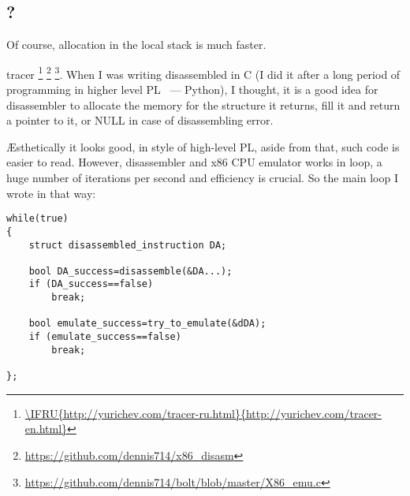 ﻿\subsection{?}

{Of course, allocation in the local stack is much faster}.

 tracer
\footnote{\url{\IFRU{http://yurichev.com/tracer-ru.html}{http://yurichev.com/tracer-en.html}}}
\footnote{\url{https://github.com/dennis714/x86_disasm}} 
\footnote{\url{https://github.com/dennis714/bolt/blob/master/X86_emu.c}}.
{When I was writing disassembled in C (I did it after a long period of programming in higher level 
\ac{PL} ~---
Python), I thought, it is a good idea for disassembler to allocate the memory for the structure it returns,
fill it and return a pointer to it, or NULL in case of disassembling error}.

{\AE{}sthetically it looks good, in style of high-level \ac{PL}, aside from that, such code is easier to read}.
{However, disassembler and x86 CPU emulator works in loop, a huge number of iterations per second and efficiency
is crucial}.
{So the main loop I wrote in that way}:

\begin{lstlisting}
while(true)
{
	struct disassembled_instruction DA;

	bool DA_success=disassemble(&DA...);
	if (DA_success==false)
		break;

	bool emulate_success=try_to_emulate(&dDA);
	if (emulate_success==false)
		break;

};
\end{lstlisting}

